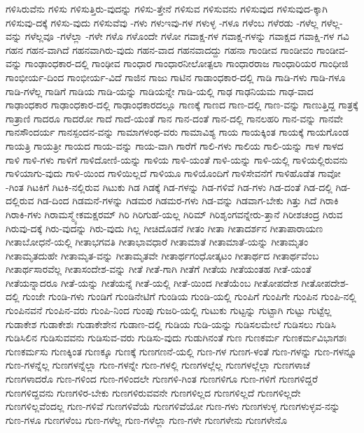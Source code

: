 {ಗಳಿಸಿರುವೆನು
ಗಳಿಸು
ಗಳಿಸುತ್ತಿರು-ವುದನ್ನು
ಗಳಿಸು-ತ್ತೇನೆ
ಗಳಿಸುವ
ಗಳಿಸುವನು
ಗಳಿಸುವುದ
ಗಳಿಸುವುದ-ಕ್ಕಾಗಿ
ಗಳಿಸುವು-ದಕ್ಕೆ
ಗಳಿಸು-ವುದು
ಗಳಿಸುವೆವು
-ಗಳು
ಗಳುಇವು-ಗಳ
ಗಳುಳ್ಳ
-ಗಳೂ
ಗಳೆಂಬ
ಗಳೆರಡು
-ಗಳೆಲ್ಲ
ಗಳೆಲ್ಲ-ವನ್ನು
ಗಳೆಲ್ಲವೂ
-ಗಳೆಲ್ಲಾ
-ಗಳೇ
ಗಳೊ
ಗಳೊಂದೇ
ಗಳೋ
ಗವಾಕ್ಷ-ಗಳ
ಗವಾಕ್ಷ-ಗಳನ್ನು
ಗವಾಕ್ಷದ
ಗವಾಕ್ಷಿ-ಗಳ
ಗವಿ
ಗಹನ
ಗಹನ-ವಾಗಿದೆ
ಗಹನವಾಗಿರು-ವುದು
ಗಹನ-ವಾದ
ಗಹನವಾದದ್ದು
ಗಹನಾ
ಗಾಂಡೀವ
ಗಾಂಡೀವಂ
ಗಾಂಡೀವ-ವನ್ನು
ಗಾಂಢಾಂಧಕಾರ-ದಲ್ಲಿ
ಗಾಂಢೀವ
ಗಾಂಧಾರ
ಗಾಂಧಾರನೀಲೋತ್ಪಲಾ
ಗಾಂಧಾರರಾಜ
ಗಾಂಧಾರಿಯರ
ಗಾಂಧೀಜಿ
ಗಾಂಭೀರ್ಯ-ದಿಂದ
ಗಾಂಭೀರ್ಯ-ವಿದೆ
ಗಾಜಿನ
ಗಾಜು
ಗಾಟಿನ
ಗಾಡಾಂಧಕಾರ-ದಲ್ಲಿ
ಗಾಡಿ
ಗಾಡಿ-ಗಳು
ಗಾಡಿ-ಗಳೂ
ಗಾಡಿ-ಗಳೆಲ್ಲ
ಗಾಡಿಗೆ
ಗಾಡಿಯ
ಗಾಡಿ-ಯನ್ನು
ಗಾಡಿಯನ್ನೇ
ಗಾಡಿ-ಯಲ್ಲಿ
ಗಾಢ
ಗಾಢನಿಯಮ
ಗಾಢ-ವಾದ
ಗಾಢಾಂಧಕಾರ
ಗಾಢಾಂಧಕಾರ-ದಲ್ಲಿ
ಗಾಢಾಂಧಕಾರದಲ್ಲೂ
ಗಾಣಕ್ಕೆ
ಗಾಣದ
ಗಾಣ-ದಲ್ಲಿ
ಗಾಣ-ವನ್ನು
ಗಾಣುತ್ತಿದ್ದ
ಗಾತ್ರಕ್ಕೆ
ಗಾತ್ರಾಣಿ
ಗಾದರೂ
ಗಾದರೋ
ಗಾದೆ
ಗಾದೆ-ಯಂತೆ
ಗಾನ
ಗಾನ-ದಂತೆ
ಗಾನ-ದಲ್ಲಿ
ಗಾನಲಹರಿ
ಗಾನ-ವನ್ನು
ಗಾನವೇ
ಗಾನಸೌಂದರ್ಯ
ಗಾನಸ್ಪಂದನ-ವನ್ನು
ಗಾಮಾಗಳಂಥ-ವರು
ಗಾಮಾವಿಶ್ಯ
ಗಾಯ
ಗಾಯಕ್ಕಿಂತ
ಗಾಯಕ್ಕೆ
ಗಾಯಗೊಂಡ
ಗಾಯತ್ರಿ
ಗಾಯತ್ರೀ
ಗಾಯದ
ಗಾಯ-ವನ್ನು
ಗಾಯ-ವಾಗಿ
ಗಾರೆಗೆ
ಗಾಲಿ-ಗಳು
ಗಾಲಿಯ
ಗಾಲಿ-ಯನ್ನು
ಗಾಳ
ಗಾಳದ
ಗಾಳಿ
ಗಾಳಿ-ಗಳು
ಗಾಳಿಗೆ
ಗಾಳಿದೋಣಿ-ಯನ್ನು
ಗಾಳಿಯ
ಗಾಳಿ-ಯಂತೆ
ಗಾಳಿ-ಯನ್ನು
ಗಾಳಿ-ಯಲ್ಲಿ
ಗಾಳಿಯಲ್ಲಿರುವನು
ಗಾಳಿಯಾಗು-ವುದು
ಗಾಳಿ-ಯಿಂದ
ಗಾಳಿಯಿಲ್ಲದೆ
ಗಾಳಿಯೂ
ಗಾಳಿಯೊಂದಿಗೆ
ಗಾಳಿಸೇವನೆಗೆ
ಗಾಳಿಹೊಡೆತ
ಗಾವೋ
-ಗಿಂತ
ಗಿಟಕಿಗೆ
ಗಿಟಕಿ-ನಲ್ಲಿರುವ
ಗಿಟುಕು
ಗಿಡ
ಗಿಡಕ್ಕೆ
ಗಿಡ-ಗಳನ್ನು
ಗಿಡ-ಗಳಿವೆ
ಗಿಡ-ಗಳು
ಗಿಡ-ದಂತೆ
ಗಿಡ-ದಲ್ಲಿ
ಗಿಡ-ದಲ್ಲಿರುವ
ಗಿಡ-ದಿಂದ
ಗಿಡಮನೆ-ಗಳನ್ನು
ಗಿಡಮರ
ಗಿಡಮರ-ಗಳು
ಗಿಡ-ವನ್ನು
ಗಿಡವಾಗ-ಬೇಕು
ಗಿತ್ತು
ಗಿದೆ
ಗಿರಾಕಿ
ಗಿರಾಕಿ-ಗಳು
ಗಿರಾಮಸ್ಮ್ಯೇಕಮಕ್ಷರಮ್
ಗಿರಿ
ಗಿರಿಗುಹೆ-ಯಲ್ಲ
ಗಿರಿಮ್
ಗಿರಿಶೃಂಗವನ್ನೇರು-ತ್ತಾನೆ
ಗಿರೀಶಚಂದ್ರ
ಗಿರುವ
ಗಿರುವು-ದಕ್ಕೆ
ಗಿರು-ವುದನ್ನು
ಗಿರು-ವುದು
ಗಿಲ್ಲ
ಗೀಚಿದೊಡನೆ
ಗೀತಂ
ಗೀತಾ
ಗೀತಾದರ್ಶನ
ಗೀತಾಪಾರಾಯಣ
ಗೀತಾಬೋಧನೆ-ಯಲ್ಲಿ
ಗೀತಾಭಗವತಿ
ಗೀತಾಭಾವಧಾರೆ
ಗೀತಾಮಾತೆ
ಗೀತಾಮಾತೆ-ಯನ್ನು
ಗೀತಾಮೃತಂ
ಗೀತಾಮೃತದುಹೇ
ಗೀತಾಮೃತ-ವನ್ನು
ಗೀತಾಮೃತವೇ
ಗೀತಾರ್ಥಗಂಧೋತ್ಕಟಂ
ಗೀತಾರ್ಥದ
ಗೀತಾರ್ಥವೆಂಬ
ಗೀತಾರ್ಥಸಾರವೆಲ್ಲ
ಗೀತಾಸಂದೇಶ-ವನ್ನು
ಗೀತೆ
ಗೀತೆ-ಗಾಗಿ
ಗೀತೆಗೆ
ಗೀತೆಯ
ಗೀತೆಯಂತಹ
ಗೀತೆ-ಯಂತೆ
ಗೀತೆಯನ್ನಾದರೂ
ಗೀತೆ-ಯನ್ನು
ಗೀತೆಯನ್ನೆ
ಗೀತೆ-ಯಲ್ಲಿ
ಗೀತೆ-ಯಿಂದ
ಗೀತೆಯೆಂಬ
ಗೀತೋಪದೇಶ
ಗೀತೋಪದೇಶ-ದಲ್ಲಿ
ಗುಂಜೇ
ಗುಂಡಿ-ಗಳು
ಗುಂಡಿಗೆ
ಗುಂಡಿನೇಟಿಗೆ
ಗುಂಡಿಯ
ಗುಂಡಿ-ಯಲ್ಲಿ
ಗುಂಪಿಗೆ
ಗುಂಪಿಗೇ
ಗುಂಪಿನ
ಗುಂಪಿ-ನಲ್ಲಿ
ಗುಂಪಿನವನೆ
ಗುಂಪಿನ-ವರು
ಗುಂಪಿ-ನಿಂದ
ಗುಂಪು
ಗುಜರಿ-ಯಲ್ಲಿ
ಗುಟುಕು
ಗುಟ್ಟನ್ನು
ಗುಟ್ಟಾಗಿ
ಗುಟ್ಟು
ಗುಟ್ಟೆಲ್ಲ
ಗುಡಾಕೇಶ
ಗುಡಾಕೇಶಃ
ಗುಡಾಕೇಶೇನ
ಗುಡಾಣ-ದಲ್ಲಿ
ಗುಡಿಯ
ಗುಡಿ-ಯನ್ನು
ಗುಡಿಸಲಮೇಲೆ
ಗುಡಿಸಲು
ಗುಡಿಸಿ
ಗುಡಿಸಿಲಿನ
ಗುಡಿಸುವವನು
ಗುಡಿಸುವ-ವರು
ಗುಡಿಸು-ವುದು
ಗುಡುಗಿನಂತೆ
ಗುಣ
ಗುಣಕರ್ಮ
ಗುಣಕರ್ಮವಿಭಾಗಶಃ
ಗುಣಕರ್ಮಸು
ಗುಣಕ್ಕಿಂತ
ಗುಣಕ್ಕೂ
ಗುಣಕ್ಕೆ
ಗುಣಗಣನೆ-ಯಲ್ಲಿ
ಗುಣ-ಗಳ
ಗುಣಗ-ಳಂತೆ
ಗುಣ-ಗಳನ್ನು
ಗುಣ-ಗಳನ್ನೂ
ಗುಣ-ಗಳನ್ನೆಲ್ಲ
ಗುಣಗಳನ್ನೆಲ್ಲಾ
ಗುಣ-ಗಳನ್ನೇ
ಗುಣ-ಗಳಲ್ಲಿ
ಗುಣಗಳಲ್ಲೆಲ್ಲ
ಗುಣಗಳಲ್ಲೆಲ್ಲಾ
ಗುಣಗಳಾಚೆ
ಗುಣಗಳಾದರೊ
ಗುಣ-ಗಳಿಂದ
ಗುಣ-ಗಳಿಂದಲೇ
ಗುಣಗಳಿ-ಗಿಂತ
ಗುಣಗಳಿಗೂ
ಗುಣ-ಗಳಿಗೆ
ಗುಣಗಳಿದ್ದರೆ
ಗುಣಗಳಿದ್ದವನು
ಗುಣಗಳಿರ-ಬೇಕು
ಗುಣಗಳಿರುವವನೇ
ಗುಣಗಳಿಲ್ಲದ
ಗುಣಗಳಿಲ್ಲದೆ
ಗುಣಗಳಿಲ್ಲದೇ
ಗುಣಗಳಿಲ್ಲವೆಂದಲ್ಲ
ಗುಣ-ಗಳಿವೆ
ಗುಣಗಳಿವೆಯೆ
ಗುಣಗಳಿವೆಯೋ
ಗುಣ-ಗಳು
ಗುಣಗಳುಳ್ಳ
ಗುಣಗಳುಳ್ಳವ-ನನ್ನು
ಗುಣ-ಗಳೂ
ಗುಣಗಳೆಂಬ
ಗುಣ-ಗಳೆಲ್ಲ
ಗುಣ-ಗಳೆಲ್ಲಾ
ಗುಣ-ಗಳೇ
ಗುಣಗಳೇನು
ಗುಣಗಳೇನೊ
}

